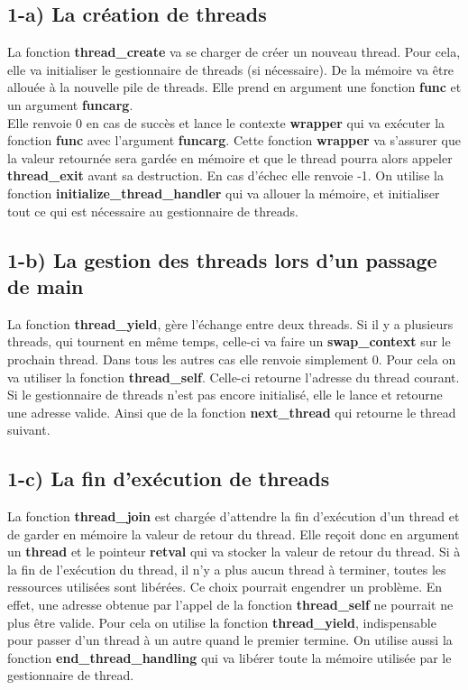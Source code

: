 \documentclass{report}
\begin{document}
\subsection*{1-a) La création de threads}
La fonction \textbf{thread\_create} va se charger de créer un nouveau thread.
Pour cela, elle va initialiser le gestionnaire de threads (si nécessaire). De la
mémoire va être allouée à la nouvelle pile de threads. Elle prend en argument
une fonction \textbf{func} et un argument \textbf{funcarg}.
\\
Elle renvoie 0 en cas de succès et lance le contexte \textbf{wrapper} qui va
exécuter la fonction \textbf{func} avec l'argument \textbf{funcarg}.
Cette fonction \textbf{wrapper} va s'assurer que la valeur retournée sera gardée
en mémoire et que le thread pourra alors appeler \textbf{thread\_exit} avant sa
destruction.
En cas d'échec elle renvoie -1.
On utilise la fonction \textbf{initialize\_thread\_handler} qui va allouer la
mémoire, et initialiser tout ce qui est nécessaire au gestionnaire de threads.

\subsection*{1-b) La gestion des threads lors d'un passage de main}
La fonction \textbf{thread\_yield}, gère l'échange entre deux threads.
Si il y a plusieurs threads, qui tournent en même temps, celle-ci va faire un
\textbf{swap\_context} sur le prochain thread.
Dans tous les autres cas elle renvoie simplement 0.
Pour cela on va utiliser la fonction \textbf{thread\_self}.
Celle-ci retourne l'adresse du thread courant. Si le gestionnaire de threads
n'est pas encore initialisé, elle le lance et retourne une adresse valide.
Ainsi que de la fonction \textbf{next\_thread} qui retourne le thread suivant.

\subsection*{1-c) La fin d'exécution de threads}
La fonction \textbf{thread\_join} est chargée d'attendre la fin d'exécution
d'un thread et de garder en mémoire la valeur de retour du thread.
Elle reçoit donc en argument un \textbf{thread} et le pointeur \textbf{retval}
qui va stocker la valeur de retour du thread.
Si à la fin de l'exécution du thread, il n'y a plus aucun thread à terminer,
toutes les ressources utilisées sont libérées. Ce choix pourrait engendrer un
problème. En effet, une adresse obtenue par l'appel de la fonction
\textbf{thread\_self} ne pourrait ne plus être valide.
Pour cela on utilise la fonction \textbf{thread\_yield}, indispensable pour
passer d'un thread à un autre quand le premier termine.
On utilise aussi la fonction \textbf{end\_thread\_handling} qui va libérer
toute la mémoire utilisée par le gestionnaire de thread.
\end{document}
